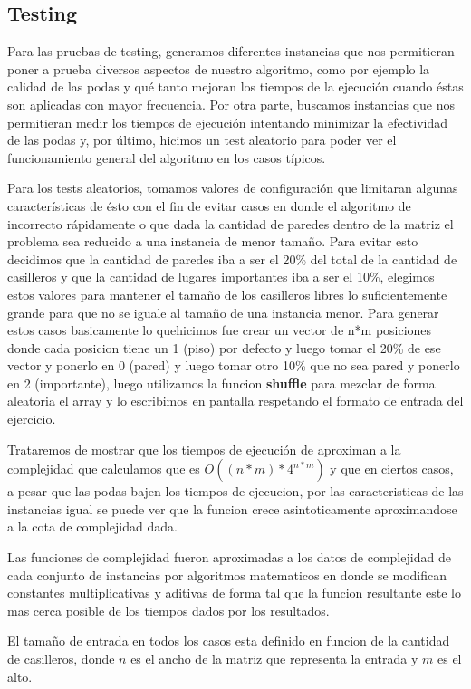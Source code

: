 \subsection{Testing}
Para las pruebas de testing, generamos diferentes instancias que nos permitieran poner a prueba diversos aspectos de nuestro algoritmo, como por ejemplo la calidad de las podas y qué tanto mejoran los tiempos de la ejecución cuando éstas son aplicadas con mayor frecuencia. Por otra parte, buscamos instancias que nos permitieran medir los tiempos de ejecución intentando minimizar la efectividad de las podas y, por último, hicimos un test aleatorio para poder ver el funcionamiento general del algoritmo en los casos típicos.

Para los tests aleatorios, tomamos valores de configuración que limitaran algunas características de ésto con el fin de evitar casos en donde el algoritmo de incorrecto rápidamente o que dada la cantidad de paredes dentro de la matriz el problema sea reducido a una instancia de menor tamaño. Para evitar esto decidimos que la cantidad de paredes iba a ser el 20\% del total de la cantidad de casilleros y que la cantidad de lugares importantes iba a ser el 10\%, elegimos estos valores para mantener el tamaño de los casilleros libres lo suficientemente grande para que no se iguale al tamaño de una instancia menor. Para generar estos casos basicamente lo quehicimos fue crear un vector de n*m posiciones donde cada posicion tiene un 1 (piso) por defecto y luego tomar el 20\% de ese vector y ponerlo en 0 (pared) y luego tomar otro 10\% que no sea pared y ponerlo en 2 (importante), luego utilizamos la funcion \textbf{shuffle} para mezclar de forma aleatoria el array y lo escribimos en pantalla respetando el formato de entrada del ejercicio.

Trataremos de mostrar que los tiempos de ejecución de aproximan a la complejidad que calculamos que es $O((n*m)*4^{n*m})$ y que en ciertos casos, a pesar que las podas bajen los tiempos de ejecucion, por las caracteristicas de las instancias igual se puede ver que la funcion crece asintoticamente aproximandose a la cota de complejidad dada.

Las funciones de complejidad fueron aproximadas a los datos de complejidad de cada conjunto de instancias por algoritmos matematicos en donde se modifican constantes multiplicativas y aditivas de forma tal que la funcion resultante este lo mas cerca posible de los tiempos dados por los resultados.

El tamaño de entrada en todos los casos esta definido en funcion de la cantidad de casilleros, donde $n$ es el ancho de la matriz que representa la entrada y $m$ es el alto.

